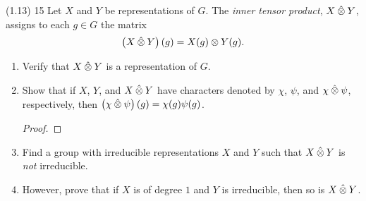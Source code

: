\documentclass{../../math174}
\date{Wednesday March 6}
\author{}
\begin{document}
\begin{problemlist}
\item[(1.13) 15] Let \(X\) and \(Y\) be representations of \(G\).  The
  \emph{inner tensor product}, \(X \mathbin{\hat\otimes} Y\), assigns to each
  \(g \in G\) the matrix
  \[
    \left( {X \mathbin{\hat\otimes} Y} \right)(g) = X(g) \otimes Y(g).
  \]
  \begin{enumerate}
  \item Verify that \(X \mathbin{\hat\otimes} Y\) is a representation of \(G\).

    \begin{solution}

    \end{solution}

  \item Show that if \(X\), \(Y\), and \(X \mathbin{\hat\otimes} Y\) have
    characters denoted by \(\chi\), \(\psi\), and
    \(\chi \mathbin{\hat\otimes} \psi\), respectively, then
    \(\left( {\chi \mathbin{\hat\otimes} \psi} \right)(g) = \chi(g) \psi(g)\).

    \begin{solution}
      \begin{proof}

      \end{proof}
    \end{solution}

  \item Find a group with irreducible representations \(X\) and \(Y\)
    such that \(X \mathbin{\hat\otimes} Y\) is \emph{not} irreducible.

    \begin{solution}

    \end{solution}

  \item However, prove that if \(X\) is of degree \(1\) and \(Y\) is
    irreducible, then so is \(X \mathbin{\hat\otimes} Y\).

    \begin{solution}

    \end{solution}
  \end{enumerate}
\end{problemlist}
\end{document}
